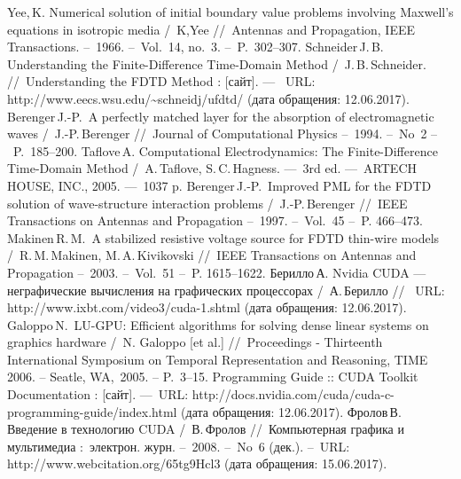 {\def\section*#1{}
\begin{thebibliography}{99}
 Yee,\,K. Numerical solution of initial boundary value problems involving
Maxwell’s equations in isotropic media /~K,Yee //~Antennas and Propagation, IEEE Transactions. --~1966. --~Vol.~14, no.~3. --~P.~302--307.
 Schneider\,J.\,B. Understanding the Finite-Difference Time-Domain Method /~J.\,B.\,Schneider. //~Understanding the FDTD Method : [сайт]. ---~ URL: http://www.eecs.wsu.edu/\textasciitilde{}schneidj/ufdtd/ (дата обращения: 12.06.2017).
Berenger\,J.-P.~A perfectly matched layer for the absorption of electromagnetic waves /~J.-P.\,Berenger //~Journal of Computational Physics --~1994. --~No~2 --~P.~185--200. 
 Taflove\,A. Computational Electrodynamics: The Finite-Difference Time-Domain Method /~A.\,Taflove, S.\,C.\,Hagness. ---~3rd ed. ---~ARTECH HOUSE, INC., 2005. ---~1037 p.
 Berenger\,J.-P.~Improved PML for the FDTD solution of wave-structure interaction problems /~J.-P.\,Berenger //~IEEE Transactions on Antennas and Propagation --~1997. --~Vol.~45 --~P. 466--473.
 Makinen\,R.\,M.~A stabilized resistive voltage source for FDTD thin-wire models /~R.\,M.\,Makinen, M.\,A.\,Kivikovski //~IEEE Transactions on Antennas and Propagation --~2003. --~Vol.~51 --~P. 1615--1622.
 Берилло\,А. Nvidia CUDA --- неграфические вычисления на графических процессорах /~А.\,Берилло //~ URL: http://www.ixbt.com/video3/cuda-1.shtml  (дата обращения: 12.06.2017).
 Galoppo\,N.~LU-GPU: Efficient algorithms for solving dense linear systems on graphics hardware /~N. Galoppo [et al.] //~Proceedings - Thirteenth International Symposium on Temporal Representation and Reasoning, TIME 2006. -- Seatle, WA,~2005. -- P.~3--15.
 Programming Guide :: CUDA Toolkit Documentation : [сайт]. ---~URL: http://docs.nvidia.com/cuda/cuda-c-programming-guide/index.html (дата обращения: 12.06.2017).
 Фролов\,В. Введение в технологию CUDA /~В.\,Фролов //~Компьютерная графика и мультимедиа :~электрон. журн. --~2008. --~No~6 (дек.). --~URL: http://www.webcitation.org/65tg9Hcl3 (дата обращения: 15.06.2017).
\end{thebibliography}
}
\clearpage
